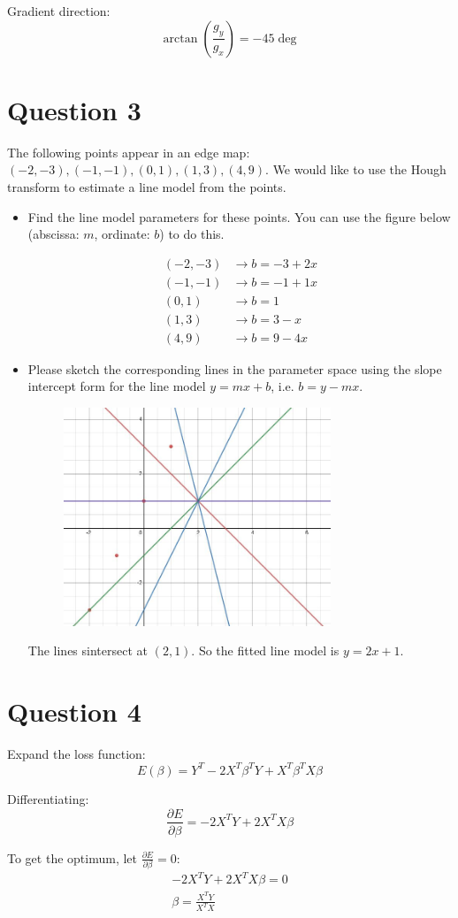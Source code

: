 \documentclass[12pt]{article}
\begin{document}
Gradient direction:
$$
    \arctan(\frac{g_y}{g_x}) = -45\deg
$$

\section*{Question 3}

The following points appear in an edge map: $(-2, -3), (-1, -1), (0, 1), (1, 3), (4, 9)$.
We would like to use the Hough transform to estimate a line model from the points. 
\begin{itemize}
    \item Find the line model parameters for these points. You can use the
    figure below (abscissa: $m$, ordinate: $b$) to do this.

    \begin{align*}
        (-2,-3) &\rightarrow b = -3 + 2x \\
        (-1,-1) &\rightarrow b = -1 + 1x \\
        (0,1) &\rightarrow b = 1 \\
        (1,3) &\rightarrow b = 3 - x \\
        (4,9) &\rightarrow b = 9 - 4x    
    \end{align*}

    \pagebreak

    \item Please sketch the corresponding lines in the parameter space using the slope intercept form for the line model
    $y = mx + b$, i.e. $b = y - mx$.
    \begin{figure}[h]
        \centering
        \includegraphics[width=8cm]{Q3.JPG}
    \end{figure}

    The lines sintersect at $(2, 1)$. So the fitted line model is $y = 2x + 1$.
\end{itemize}
 
\section*{Question 4}

Expand the loss function:
$$
    E(\beta) = Y^T - 2X^T \beta^T Y + X^T \beta^T X \beta 
$$

Differentiating:
$$
    \frac{\partial E}{\partial \beta} = -2X^T Y + 2X^T X \beta
$$

To get the optimum, let $\frac{\partial E}{\partial \beta} = 0$:
\begin{align*}
    -2X^T Y + 2X^T X \beta = 0 \\ 
    \beta = \frac{X^T Y}{X^T X}
\end{align*}
\end{document}
